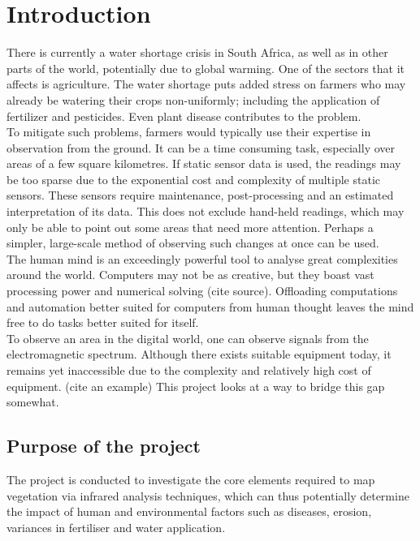 \chapter{Introduction}


There is currently a water shortage crisis in South Africa, as well as in other parts of the world, potentially due to global warming. One of the sectors that it affects is agriculture. The water shortage puts added stress on farmers who may already be watering their crops non-uniformly; including the application of fertilizer and pesticides. Even plant disease contributes to the problem.\\

\noindent
To mitigate such problems, farmers would typically use their expertise in observation from the ground. It can be a time consuming task, especially over areas of a few square kilometres. If static sensor data is used, the readings may be too sparse due to the exponential cost and complexity of multiple static sensors. These sensors require maintenance, post-processing and an estimated interpretation of its data. This does not exclude hand-held readings, which may only be able to point out some areas that need more attention. Perhaps a simpler, large-scale method of observing such changes at once can be used.\\

\noindent
The human mind is an exceedingly powerful tool to analyse great complexities around the world. Computers may not be as creative, but they boast vast processing power and numerical solving (cite source). Offloading computations and automation better suited for computers from human thought leaves the mind free to do tasks better suited for itself.\\

\noindent
To observe an area in the digital world, one can observe signals from the electromagnetic spectrum. Although there exists suitable equipment today, it remains yet inaccessible due to the complexity and relatively high cost of equipment. (cite an example) This project looks at a way to bridge this gap somewhat.

\section{Purpose of the project}

The project is conducted to investigate the core elements required to map vegetation via infrared analysis techniques, which can thus potentially determine the impact of human and environmental factors such as diseases, erosion, variances in fertiliser and water application.\\

